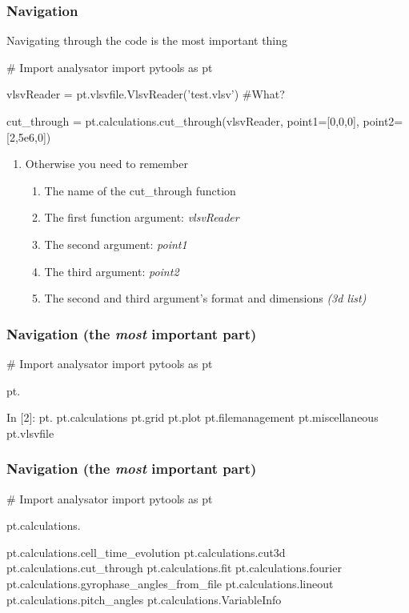 \documentclass{beamer}
\begin{document}
\begin{frame}[fragile]
 \frametitle{Navigation}
 
 Navigating through the code is the most important thing
 
 \begin{python}[basicstyle=\tiny]
  # Import analysator
  import pytools as pt
  
  vlsvReader = pt.vlsvfile.VlsvReader('test.vlsv') #What?
  
  cut_through = pt.calculations.cut_through(vlsvReader, point1=[0,0,0], point2=[2,5e6,0])
 \end{python}
 
 \begin{enumerate}
  \item Otherwise you need to remember
  \begin{enumerate}
   \item The name of the cut\_through function
   \item The first function argument: \emph{vlsvReader}
   \item The second argument: \emph{point1}
   \item The third argument: \emph{point2}
   \item The second and third argument's format and dimensions \emph{(3d list)}
  \end{enumerate}
 \end{enumerate}

\end{frame}



\begin{frame}[fragile]
 \frametitle{Navigation (the \emph{most} important part)}
 \begin{python}[basicstyle=\tiny]
  # Import analysator
  import pytools as pt
  
  pt.
 \end{python}
 \begin{python}[basicstyle=\tiny]
In [2]: pt.
pt.calculations    pt.grid            pt.plot            
pt.filemanagement  pt.miscellaneous   pt.vlsvfile    
 \end{python}
\end{frame}

\begin{frame}[fragile]
 \frametitle{Navigation (the \emph{most} important part)}
 \begin{python}[basicstyle=\tiny]
  # Import analysator
  import pytools as pt
  
  pt.calculations.
 \end{python}
 \begin{python}[basicstyle=\tiny]
pt.calculations.cell_time_evolution
pt.calculations.cut3d
pt.calculations.cut_through
pt.calculations.fit
pt.calculations.fourier
pt.calculations.gyrophase_angles_from_file
pt.calculations.lineout
pt.calculations.pitch_angles
pt.calculations.VariableInfo
 \end{python}
\end{frame}
\end{document}
